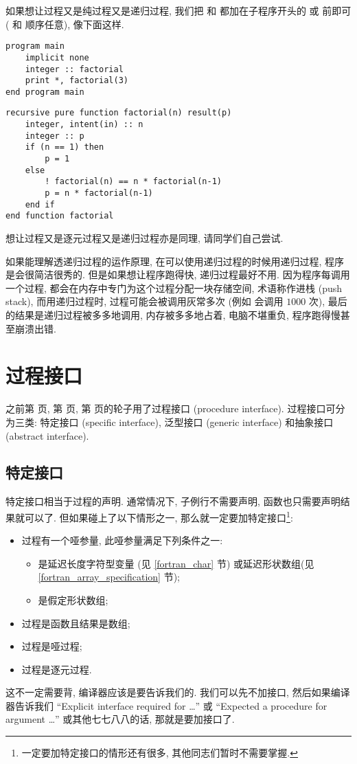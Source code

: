 如果想让过程又是纯过程又是递归过程, 我们把  和  都加在子程序开头的  或  前即可 ( 和  顺序任意), 像下面这样.
\begin{lstlisting}
program main
    implicit none
    integer :: factorial
    print *, factorial(3)
end program main
\end{lstlisting}
\begin{lstlisting}
recursive pure function factorial(n) result(p)
    integer, intent(in) :: n
    integer :: p
    if (n == 1) then
        p = 1
    else
        ! factorial(n) == n * factorial(n-1)
        p = n * factorial(n-1)
    end if
end function factorial
\end{lstlisting}
想让过程又是逐元过程又是递归过程亦是同理, 请同学们自己尝试.

如果能理解透递归过程的运作原理, 在可以使用递归过程的时候用递归过程, 程序是会很简洁很秀的. 但是如果想让程序跑得快, 递归过程最好不用. 因为程序每调用一个过程, 都会在内存中专门为这个过程分配一块存储空间, 术语称作进栈 (push stack), 而用递归过程时, 过程可能会被调用灰常多次 (例如  会调用  $1000$ 次), 最后的结果是递归过程被多多地调用, 内存被多多地占着, 电脑不堪重负, 程序跑得慢甚至崩溃出错.

\section{过程接口} \label{fortran_interface} 

之前第 \pageref{assumed-shape_array_program} 页, 第 \pageref{dummy_procedure_program} 页, 第 \pageref{elemental_procedure_program} 页的轮子用了过程接口 (procedure interface). 过程接口可分为三类: 特定接口 (specific interface), 泛型接口 (generic interface) 和抽象接口 (abstract interface). 

\subsection{特定接口} 

特定接口相当于过程的声明. 通常情况下, 子例行不需要声明, 函数也只需要声明结果就可以了. 但如果碰上了以下情形之一, 那么就一定要加特定接口\footnote{一定要加特定接口的情形还有很多, 其他同志们暂时不需要掌握.}:\label{whether_specific_interface}
\begin{itemize} 
    \item 过程有一个哑参量, 此哑参量满足下列条件之一: \begin{itemize} 
        \item 是延迟长度字符型变量 (见 \ref{fortran_char} 节) 或延迟形状数组(见\ref{fortran_array_specification} 节);
        \item 是假定形状数组;
    \end{itemize} 
    \item 过程是函数且结果是数组;
    \item 过程是哑过程;
    \item 过程是逐元过程.
\end{itemize} 
这不一定需要背, 编译器应该是要告诉我们的. 我们可以先不加接口, 然后如果编译器告诉我们 ``Explicit interface required for \dots{}'' 或 ``Expected a procedure for argument \dots{}'' 或其他七七八八的话, 那就是要加接口了. 

